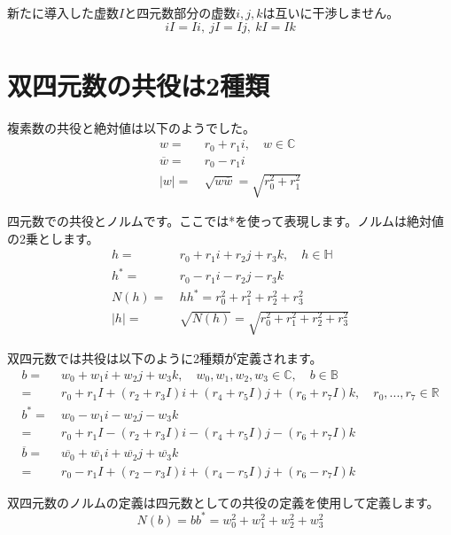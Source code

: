\documentclass[a4paper,12pt,notitlepage]{jsreport}
\begin{document}
新たに導入した虚数$I$と四元数部分の虚数$i, j, k$は互いに干渉しません。
\begin{equation}
  iI=Ii,~jI=Ij,~kI=Ik
\end{equation}

\section{双四元数の共役は2種類}

複素数の共役と絶対値は以下のようでした。
\begin{equation}
  \begin{split}
    w=~&r_0+r_1i,\quad w\in\mathbb{C}\\
    \overline{w}=~&r_0-r_1i\\
    |w|=~&\sqrt{w\overline{w}}=\sqrt{r_0^2+r_1^2}
  \end{split}
\end{equation}

四元数での共役とノルムです。ここでは*を使って表現します。ノルムは絶対値の2乗とします。
\begin{equation}
  \begin{split}
    h=~&r_0+r_1i+r_2j+r_3k,\quad h\in\mathbb{H}\\
    h^*=~&r_0-r_1i-r_2j-r_3k\\
    N(h)=~&hh^*=r_0^2+r_1^2+r_2^2+r_3^2\\
    |h|=~&\sqrt{N(h)}=\sqrt{r_0^2+r_1^2+r_2^2+r_3^2}
  \end{split}
\end{equation}

双四元数では共役は以下のように2種類が定義されます。
\begin{equation}
  \begin{split}
    b=~&w_0+w_1i+w_2j+w_3k,\quad w_0,w_1,w_2,w_3\in\mathbb{C},\quad b\in\mathbb{B}\\
    =~&r_0+r_1I+(r_2+r_3I)i+(r_4+r_5I)j+(r_6+r_7I)k,\quad r_0,...,r_7\in\mathbb{R}\\
    b^*=~&w_0-w_1i-w_2j-w_3k\\
    =~&r_0+r_1I-(r_2+r_3I)i-(r_4+r_5I)j-(r_6+r_7I)k\\
    \overline{b}=~&\overline{w_0}+\overline{w_1}i+\overline{w_2}j+\overline{w_3}k\\
    =~&r_0-r_1I+(r_2-r_3I)i+(r_4-r_5I)j+(r_6-r_7I)k
  \end{split}
\end{equation}

双四元数のノルムの定義は四元数としての共役の定義を使用して定義します。
\begin{equation}
  N(b)=bb^*=w_0^2+w_1^2+w_2^2+w_3^2
\end{equation}
\end{document}
